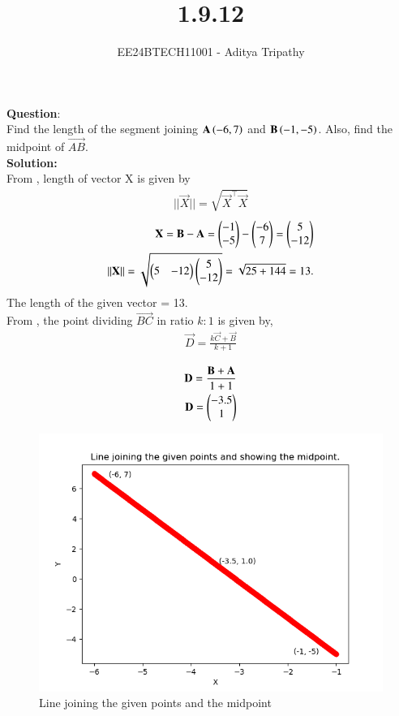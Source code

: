 \documentclass[journal]{IEEEtran}
\begin{document}

\vspace{3cm}

\title{1.9.12}
\author{EE24BTECH11001 - Aditya Tripathy
}
 \maketitle
{\let\newpage\relax\maketitle}

\renewcommand{\thefigure}{\theenumi}
\renewcommand{\thetable}{\theenumi}
\setlength{\intextsep}{10pt} %


\renewcommand{\thetable}{\theenumi}


\textbf{Question}:\\
Find the length of the segment joining $\mathbf{A}\left(-6,7\right)$ and $\mathbf{B}\left(-1,-5\right)$. Also, find the midpoint of $\vec{AB}$.
\\
\textbf{Solution: }\\
From , length of vector X is given by
\begin{align} 
    ||\vec{X}|| = \sqrt{\vec{X}^\top \vec{X}}
\end{align}
\begin{align}
    \mathbf{X} = \mathbf{B} - \mathbf{A} = \begin{pmatrix}-1 \\ -5\end{pmatrix} - \begin{pmatrix}-6 \\ 7\end{pmatrix} = \begin{pmatrix}5 \\ -12\end{pmatrix}\\
    ||\mathbf{X}|| = \sqrt{\begin{pmatrix}5 & -12\end{pmatrix}\begin{pmatrix}5 \\ -12\end{pmatrix}} = \sqrt{25 + 144} = 13.\\
\end{align}
The length of the given vector = 13.\\
From , the point dividing $\vec{BC}$ in ratio $k:1$ is given by,
\begin{align}
    \vec{D} = \frac{k\vec{C}+\vec{B}}{k+1}\\
\end{align}
\begin{align}
    \mathbf{D} = \frac{\mathbf{B}+\mathbf{A}}{1+1} \\
    \mathbf{D} = \begin{pmatrix}-3.5 \\ 1\end{pmatrix}
\end{align}
    
\begin{figure}[h!]
   \centering
   \includegraphics[width=0.7\linewidth]{figs/fig.png}
   \caption{Line joining the given points and the midpoint}
\end{figure}
\end{document}
